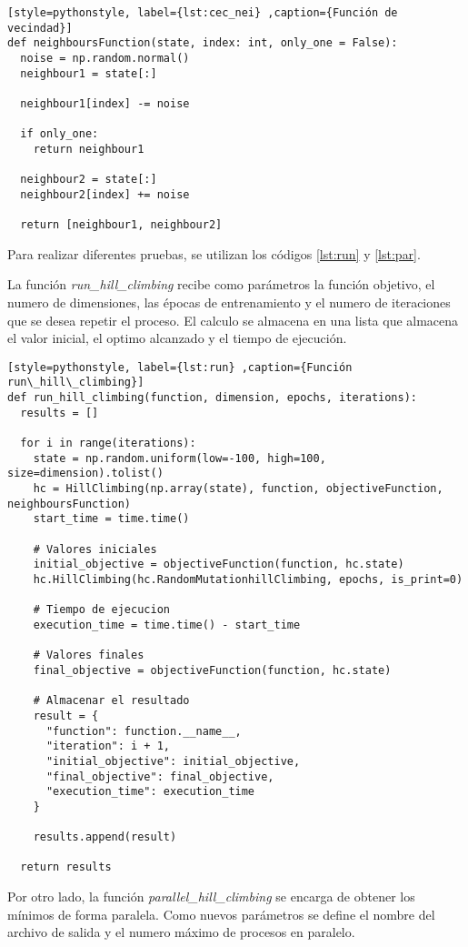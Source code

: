 \documentclass[12pt,twoside]{article}
\begin{document}
\begin{lstlisting}[style=pythonstyle, label={lst:cec_nei} ,caption={Función de vecindad}]
def neighboursFunction(state, index: int, only_one = False):
  noise = np.random.normal()
  neighbour1 = state[:]

  neighbour1[index] -= noise

  if only_one:
    return neighbour1

  neighbour2 = state[:]
  neighbour2[index] += noise

  return [neighbour1, neighbour2]
\end{lstlisting}

Para realizar diferentes pruebas, se utilizan los códigos \ref{lst:run} y \ref{lst:par}. 

La función \textit{run\_hill\_climbing} recibe como parámetros la función objetivo, el numero de dimensiones, las épocas de entrenamiento y el numero de iteraciones que se desea repetir el proceso. El calculo se almacena en una lista que almacena el valor inicial, el optimo alcanzado y el tiempo de ejecución.

\begin{lstlisting}[style=pythonstyle, label={lst:run} ,caption={Función run\_hill\_climbing}]
def run_hill_climbing(function, dimension, epochs, iterations):
  results = []

  for i in range(iterations):
    state = np.random.uniform(low=-100, high=100, size=dimension).tolist()
    hc = HillClimbing(np.array(state), function, objectiveFunction, neighboursFunction)
    start_time = time.time()

    # Valores iniciales
    initial_objective = objectiveFunction(function, hc.state)
    hc.HillClimbing(hc.RandomMutationhillClimbing, epochs, is_print=0)

    # Tiempo de ejecucion    
    execution_time = time.time() - start_time

    # Valores finales
    final_objective = objectiveFunction(function, hc.state)

    # Almacenar el resultado
    result = {
	  "function": function.__name__,
	  "iteration": i + 1,
	  "initial_objective": initial_objective,
	  "final_objective": final_objective,
	  "execution_time": execution_time  
    }

    results.append(result)

  return results
\end{lstlisting}

Por otro lado, la función \textit{parallel\_hill\_climbing} se encarga de obtener los mínimos de forma paralela. Como nuevos parámetros se define el nombre del archivo de salida y el numero máximo de procesos en paralelo.
\end{document}
